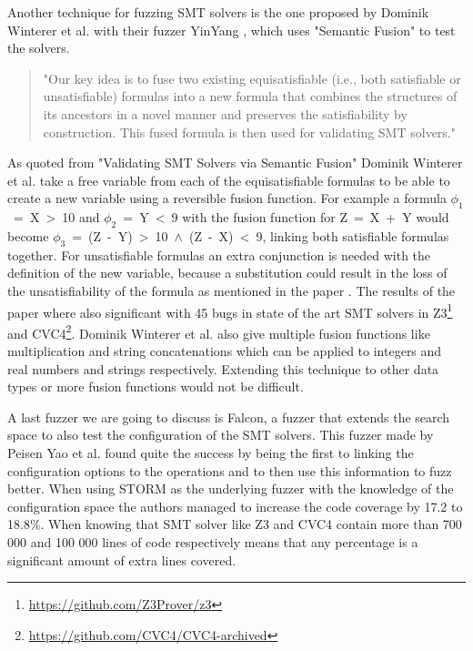 Another technique for fuzzing SMT solvers is the one proposed by Dominik Winterer et al. with their fuzzer YinYang \cite{43YinYang}, which uses "Semantic Fusion" to test the solvers.
\begin{quote}
	\label{quote:Fuzzing:YinYang}
	"Our key idea is to fuse two existing equisatisfiable (i.e., both satisfiable or unsatisfiable) formulas into a new formula that combines the structures of its ancestors in a novel manner and preserves the satisfiability by construction. This fused formula is then used for validating SMT solvers."
\end{quote} As quoted from "Validating SMT Solvers via Semantic Fusion" \cite{43YinYang}
Dominik Winterer et al. take a free variable from each of the equisatisfiable formulas to be able to create a new variable using a reversible fusion function. For example a formula \mbox{$\phi_1$ = X > 10} and \mbox{$\phi_2$ = Y < 9} with the fusion function for \mbox{Z = X + Y} would become \mbox{$\phi_3$ = (Z - Y) > 10 $\land$ (Z - X) < 9}, linking both satisfiable formulas together. For unsatisfiable formulas an extra conjunction is needed with the definition of the new variable, because a substitution could result in the loss of the unsatisfiability of the formula as mentioned in the paper \cite{43YinYang}. The results of the paper where also significant with 45 bugs in state of the art SMT solvers in Z3\footnote{\url{https://github.com/Z3Prover/z3}} and CVC4\footnote{\url{https://github.com/CVC4/CVC4-archived}}. Dominik Winterer et al. also give multiple fusion functions like multiplication and string concatenations which can be applied to integers and real numbers and strings respectively. Extending this technique to other data types or more fusion functions would not be difficult.


A last fuzzer we are going to discuss is Falcon, a fuzzer that extends the search space to also test the configuration of the SMT solvers. This fuzzer made by Peisen Yao et al. \cite{42FalconFuzzingConfigurationSettingsAndNormal} found quite the success by being the first to linking the configuration options to the operations and to then use this information to fuzz better.
When using STORM as the underlying fuzzer with the knowledge of the configuration space the authors managed to increase the code coverage by 17.2 to 18.8\%. When knowing that SMT solver like Z3 and CVC4 contain more than 700 000 and 100 000 lines of code respectively means that any percentage is a significant amount of extra lines covered.

